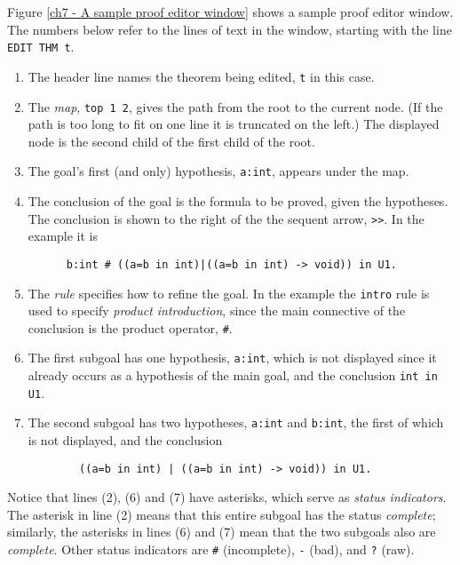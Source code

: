 Figure \ref{ch7 - A sample proof editor window}
shows a sample proof editor{} window.
The numbers below refer to the lines of text in the window, starting
with the line {\tt EDIT THM t}.
%
\begin {enumerate}
\item
    The header{} line names the theorem being edited, {\tt t}
    in this case.

\item
    The {\em map}{}, {\tt top 1 2},
    gives the path from the root to the current node.
    (If the path is too long to fit on one line it is truncated on the left.)
    The displayed node is the second child of the first child of the root.

\item The goal's first (and only) hypothesis{}, {\tt a:int},
    appears under the map.

\item
    The conclusion{} of the goal is the formula to be proved,
    given the hypotheses.
    The conclusion is shown to the right of the the sequent arrow, {\tt >>}.
    In the example it is
\begin{verbatim}
      b:int # ((a=b in int)|((a=b in int) -> void)) in U1.
\end{verbatim}

\item
    The {\em rule}{} specifies how to refine the goal.
    In the example the {\tt intro} rule is used to specify
    {\em product introduction}, since the main connective of the conclusion is
    the product operator, {\tt \#}.

\item
    The first subgoal has one hypothesis, {\tt a:int}, which is not
    displayed since it already occurs as a hypothesis of the main goal, and
    the conclusion {\tt int in U1}.

\item
    The second subgoal has two hypotheses, {\tt a:int} and {\tt b:int}, the
    first of which is not displayed,
    and the conclusion
\begin{verbatim}
        ((a=b in int) | ((a=b in int) -> void)) in U1.
\end{verbatim}
\end {enumerate}

Notice that lines (2), (6) and (7) have asterisks, which serve as
{\em status{} indicators}.
The asterisk in line (2) means that this entire subgoal has the status
{\em complete};
similarly, the asterisks in lines (6) and (7) mean that the two subgoals
also are {\em complete}.
Other status indicators are {\tt \#} (incomplete), {\tt -} (bad), and {\tt ?}
(raw).

